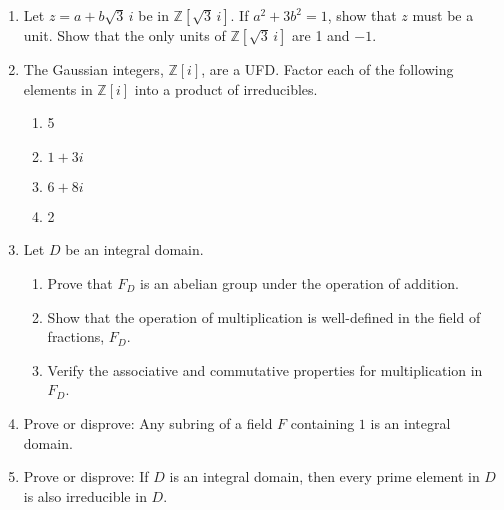 {\small
\begin{enumerate}

\item
Let $z = a + b \sqrt{3}\, i$ be in ${\mathbb Z}[ \sqrt{3}\, i]$. If $a^2 +3 b^2 = 1$, show that $z$ must be a unit. Show that the only units of ${\mathbb Z}[ \sqrt{3}\, i ]$ are 1 and $-1$. 

\item
The Gaussian integers, ${\mathbb Z}[i]$, are a UFD.  Factor each of the following elements in ${\mathbb Z}[i]$ into a product of irreducibles.
\begin{multicols}{2}
\begin{enumerate}

\item 
5

\item 
$1 + 3i$

\item 
$6+8i$

\item 
2

\end{enumerate}
\end{multicols}

 
\item
Let $D$ be an integral domain. 
\begin{enumerate}
 
 \item
Prove that $F_D$ is an abelian group under the operation of addition.

 \item
Show that the operation of multiplication is well-defined in the field
of fractions, $F_D$.  
 
 \item
Verify the associative and commutative properties for multiplication
in $F_D$. 

\end{enumerate}


\item
Prove or disprove: Any subring of a field $F$ containing $1$ is an
integral domain.

\item
Prove or disprove: If $D$ is an integral domain, then every prime element in $D$ is also irreducible in $D$.




\end{enumerate}}
